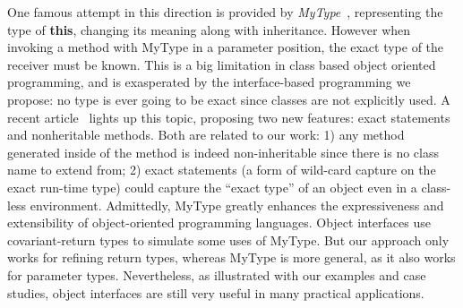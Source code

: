 One famous attempt in this direction is provided by
\emph{MyType}~\cite{bruce1994paradigmatic}, representing the type of
\textbf{this}, changing its meaning along with inheritance. However when
invoking a method with MyType in a parameter position, the exact type of the
receiver must be known.  This is a big limitation in class based object oriented
programming, and is exasperated by the interface-based programming we propose: no
type is ever going to be exact since classes are not explicitly used. A recent
article~\cite{Saito2013933} lights up this topic, proposing two
new features: exact statements and nonheritable methods. Both are
related to our work: 1) any method generated inside of the \Q@of@ method is indeed
non-inheritable since there is no class name to extend from; 2) exact
statements (a form of wild-card capture on the exact run-time type) could
capture the ``exact type'' of an object even in a class-less
environment. 
Admittedly, MyType greatly enhances the expressiveness and extensibility of
object-oriented programming languages. Object interfaces use covariant-return types to
simulate some uses of MyType. But our approach only works for refining
return types, whereas MyType is more general, as it also works for
parameter types. Nevertheless, as illustrated with our examples and 
case studies, object interfaces are still very useful in many 
practical applications.


\begin{comment}
\subsection{Type-Directed Translations/Syntactic Sugar}
\marco{I'm tring to merge this and the next one}
Language extensions are often implemented as syntactic sugar of the base
language. For example, Scala compiler supports XML syntax in normal Scala code
directly (after Scala ?, users need to import \texttt{scala-xml} library
manually). However, this approach is hard in terms of implementation, because it
requires extending the compiler. Also, this approach does not support combining
multiple extensions into one.

SugarJ~\cite{erdweg11sugarj} is a Java-based extensible programming language
that allows programmers to extend the base language with custom language
features by definitions in meta-DSLs (SDF, Stratego, etc). 
\yanlin{Is new syntax really a ``drawback''? I think for some system, like
  SugarJ, one of purpose IS to introduce these new syntax.}  Drawbacks: new
syntax. To create the extension, programmers have to work with multiple
languages (SDF, stratego, etc) while our approach works totally in Java
environment.

We can model certain types of language extensions with annotations 
only, but those extensions do not introduce new syntax: they 
merely do automatic code generation. 
\end{comment}

